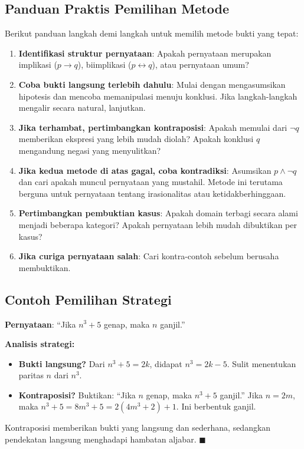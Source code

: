 \subsection{Panduan Praktis Pemilihan Metode}

Berikut panduan langkah demi langkah untuk memilih metode bukti yang tepat:

\begin{enumerate}
  \item \textbf{Identifikasi struktur pernyataan}: Apakah pernyataan merupakan implikasi ($p \rightarrow q$), biimplikasi ($p \leftrightarrow q$), atau pernyataan umum?

  \item \textbf{Coba bukti langsung terlebih dahulu}: Mulai dengan mengasumsikan hipotesis dan mencoba memanipulasi menuju konklusi. Jika langkah-langkah mengalir secara natural, lanjutkan.

  \item \textbf{Jika terhambat, pertimbangkan kontraposisi}: Apakah memulai dari $\neg q$ memberikan ekspresi yang lebih mudah diolah? Apakah konklusi $q$ mengandung negasi yang menyulitkan?

  \item \textbf{Jika kedua metode di atas gagal, coba kontradiksi}: Asumsikan $p \wedge \neg q$ dan cari apakah muncul pernyataan yang mustahil. Metode ini terutama berguna untuk pernyataan tentang irasionalitas atau ketidakberhinggaan.

  \item \textbf{Pertimbangkan pembuktian kasus}: Apakah domain terbagi secara alami menjadi beberapa kategori? Apakah pernyataan lebih mudah dibuktikan per kasus?

  \item \textbf{Jika curiga pernyataan salah}: Cari kontra-contoh sebelum berusaha membuktikan.
\end{enumerate}

\subsection{Contoh Pemilihan Strategi}

\begin{contoh}
\textbf{Pernyataan}: ``Jika $n^3 + 5$ genap, maka $n$ ganjil.''

\textbf{Analisis strategi:}
\begin{itemize}
    \item \textbf{Bukti langsung?} Dari $n^3 + 5 = 2k$, didapat $n^3 = 2k - 5$. Sulit menentukan paritas $n$ dari $n^3$.
    \item \textbf{Kontraposisi?} Buktikan: ``Jika $n$ genap, maka $n^3 + 5$ ganjil.'' Jika $n = 2m$, maka $n^3 + 5 = 8m^3 + 5 = 2(4m^3 + 2) + 1$. Ini berbentuk ganjil. \checkmark
\end{itemize}

Kontraposisi memberikan bukti yang langsung dan sederhana, sedangkan pendekatan langsung menghadapi hambatan aljabar. $\blacksquare$
\end{contoh}

